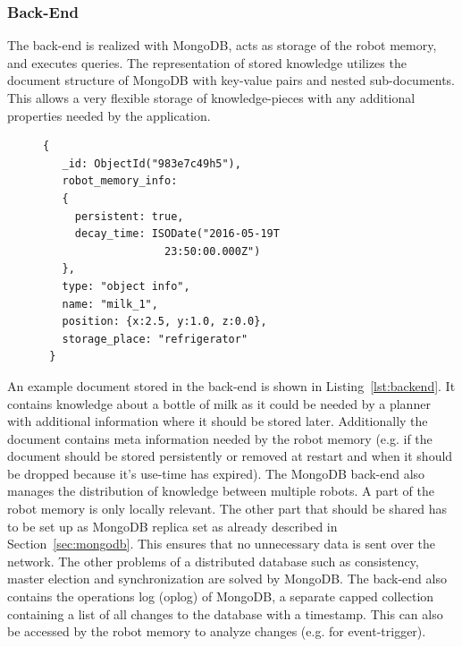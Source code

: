 \documentclass[a4paper,11pt]{article}
\newcommand{\refsec}[1]{Section~\ref{#1}}
\newcommand{\reflst}[1]{Listing~\ref{#1}}
\begin{document}
\subsubsection{Back-End}
\label{sec:back-end}
The back-end is realized with MongoDB, acts as storage of the robot
memory, and executes queries. The representation of stored knowledge
utilizes the document structure of MongoDB with key-value pairs and
nested sub-documents. This allows a very flexible storage of
knowledge-pieces with any additional properties needed by the
application.
\begin{figure}
\begin{lstlisting}[style=SmallJSON,
  caption={Representation of a knowledge piece in the back-end},
  label=lst:backend,
  framexleftmargin=1pt, xleftmargin=0pt,
 morekeywords={}, numbers=none]
 {
   _id: ObjectId("983e7c49h5"),
   robot_memory_info:
   {
     persistent: true,
     decay_time: ISODate("2016-05-19T
                   23:50:00.000Z")
   },
   type: "object info",
   name: "milk_1",
   position: {x:2.5, y:1.0, z:0.0},
   storage_place: "refrigerator"
 }
\end{lstlisting}
\end{figure}
An example document stored in the back-end is shown in
\reflst{lst:backend}.
It contains knowledge about a bottle of milk as it could be needed by
a planner with additional information where it should be stored
later. Additionally the document contains meta information needed by
the robot memory (e.g. if the document should be stored persistently
or removed at restart and when it should be dropped because it's
use-time has expired). The MongoDB back-end also manages the
distribution of knowledge between multiple robots. A part of the robot
memory is only locally relevant. The other part that should be shared
has to be set up as MongoDB replica set as already described in
\refsec{sec:mongodb}. This ensures that no unnecessary data is sent
over the network. The other problems of a distributed database such as
consistency, master election and synchronization are solved by
MongoDB. The back-end also contains the operations log (oplog) of MongoDB, a separate
capped collection containing a list of all changes to the database
with a timestamp. This can also be accessed by the robot memory to
analyze changes (e.g. for event-trigger).
\end{document}
